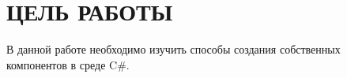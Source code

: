 \section{ЦЕЛЬ РАБОТЫ}

В данной работе необходимо изучить способы создания собственных компонентов
в среде C\#.

\newpage
